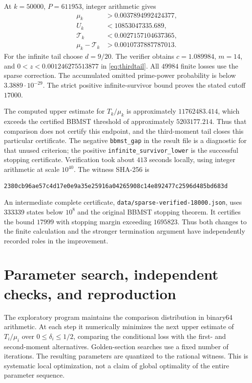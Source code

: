 \documentclass[11pt]{article}
\begin{document}
At $k=50000$, $P=611953$, integer arithmetic gives
\begin{align*}
 \mu_k&>0.0037894992424377,\\
 U_k&<10853047335.689,\\
 \mathcal T_k&<0.0027157104637365,\\
 \mu_k-\mathcal T_k&>0.0010737887787013.
\end{align*}
For the infinite tail choose $d=9/20$. The verifier obtains
$c=1.089984$, $m=14$, and $0<z<0.001246275513877$ in
\eqref{eq:thirdtail}. All $49984$ finite losses use the sparse correction.
The accumulated omitted prime-power probability is below
$3.3889\cdot10^{-29}$. The strict positive infinite-survivor bound proves
the stated cutoff $17000$.

The computed upper estimate for $T_k/\mu_k$ is approximately $11762483.414$,
which exceeds the certified BBMST threshold of approximately $5203177.214$.
Thus that comparison does not certify this endpoint, and the third-moment tail closes this particular
certificate. The negative \texttt{bbmst\_gap} in the result file is a
diagnostic for that unused criterion; the positive
\texttt{infinite\_survivor\_lower} is the successful stopping certificate.
Verification took about $413$ seconds locally, using integer arithmetic
at scale $10^{40}$. The witness SHA-256 is
\begin{lstlisting}[basicstyle=\ttfamily\scriptsize,breaklines=true]
2380cb96ae57c4d17e0e9a35e25916a04265908c14e892477c2596d485bd683d
\end{lstlisting}

An intermediate complete certificate, \texttt{data/sparse-verified-18000.json},
uses $333339$ states below $10^8$ and the original BBMST stopping theorem.
It certifies the bound $17999$ with stopping margin exceeding $1695823$.
Thus both changes to the finite calculation and the stronger termination
argument have independently recorded roles in the improvement.

\section{Parameter search, independent checks, and reproduction}
The exploratory program maintains the comparison distribution in binary64
arithmetic. At each step it numerically minimizes the next upper estimate
of $T_i/\mu_i$ over $0\leq\delta_i\leq1/2$, comparing the conditional
loss with the first- and second-moment alternatives. Golden-section searches
use a fixed number of iterations. The resulting parameters are quantized
to the rational witness. This is systematic local optimization, not a
claim of global optimality of the entire parameter sequence.
\end{document}
